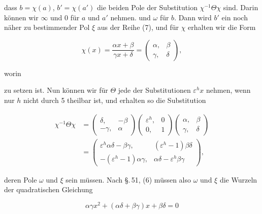 dass $b = \chi(a)$, $b' = \chi(a')$ die beiden Pole der Substitution
$\chi^{-1}\Theta\chi$ sind. %
Darin k\"onnen wir $\infty$ und 0 f\"ur $a$ und $a'$ nehmen. %
und $\omega$ f\"ur $b$. Dann wird $b'$ ein noch n\"aher zu bestimmender
Pol $\xi$ aus der Reihe (7), und f\"ur $\chi$ erhalten wir die Form

\[
\chi(x) = \frac{\alpha x + \beta}{\gamma x + \delta} = \begin{pmatrix} \alpha, & \beta \\ \gamma, & \delta \end{pmatrix},
\]

worin


zu setzen ist.
Nun k\"onnen wir f\"ur $\Theta$ jede der Substitutionen $\varepsilon^h x$ nehmen,
wenn nur $h$ nicht durch 5 theilbar ist, und erhalten so die Substitution


\[
\begin{aligned}
\chi^{-1}\Theta\chi &= \begin{pmatrix} \delta, & -\beta \\ -\gamma, & \alpha \end{pmatrix}\begin{pmatrix} \varepsilon^h, & 0 \\ 0, & 1 \end{pmatrix}\begin{pmatrix} \alpha, & \beta \\ \gamma, & \delta \end{pmatrix} \\
&= \begin{pmatrix} \varepsilon^h\alpha\delta - \beta\gamma, & (\varepsilon^h-1)\beta\delta \\ -(\varepsilon^h-1)\alpha\gamma, & \alpha\delta - \varepsilon^h\beta\gamma \end{pmatrix},
\end{aligned}
\]

deren Pole $\omega$ und $\xi$ sein m\"ussen. Nach \S.\,51, (6) m\"ussen also
$\omega$ und $\xi$ die Wurzeln der quadratischen Gleichung

\[
\alpha\gamma x^2 + (\alpha\delta + \beta\gamma)x + \beta\delta = 0
\]


